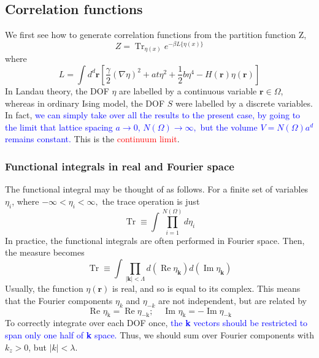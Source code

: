 \documentclass[12pt,titlepage]{article}
\newcommand{\redp}[1]{\textcolor{red}{#1}}
\newcommand{\bluep}[1]{\textcolor{blue}{#1}}
\numberwithin{equation}{section}
\begin{document}
\subsection{Correlation functions}
We first see how to generate correlation functions from the partition function Z,
\begin{equation}
Z=\operatorname{Tr}_{\eta(x)} e^{-\beta L\{\eta(x)\}}
\end{equation}
where
\begin{equation}
L=\int d^{d} \mathbf{r}\left[\frac{\gamma}{2}(\nabla \eta)^{2}+a t \eta^{2}+\frac{1}{2} b \eta^{4}-H(\mathbf{r}) \eta(\mathbf{r})\right]
\end{equation}
In Landau theory, the DOF $\eta$ are labelled by a continuous variable $\mathbf{r} \in \Omega$, whereas in ordinary Ising model, the DOF $S$ were labelled by a discrete variables. In fact, \bluep{we can simply take over all the results to the present case, by going to the limit that lattice spacing $a \rightarrow 0$, $N(\Omega) \rightarrow \infty,$ but the volume $V=N(\Omega) a^{d}$ remains constant.} This is the \redp{continuum limit}.

\subsubsection{Functional integrals in real and Fourier space}
The functional integral may be thought of as follows. For a finite set of variables $\eta_i$, where $-\infty<\eta_{i}<\infty,$ the trace operation is just
\begin{equation}
\operatorname{Tr} \equiv \int \prod_{i=1}^{N(\Omega)} d \eta_{i}
\end{equation}
In practice, the functional integrals are often performed in Fourier space. Then, the measure becomes
\begin{equation}
\operatorname{Tr} \equiv \int \prod_{|\mathbf{k}|<\Lambda} d\left(\operatorname{Re} \eta_{\mathbf{k}}\right) d\left(\operatorname{Im} \eta_{\mathbf{k}}\right)
\end{equation}
Usually, the function $\eta(\mathbf{r})$ is real, and so is equal to its complex. This means that the Fourier components $\eta_{k}$ and $\eta_{-k}$ are not independent, but are related by
\begin{equation}
\text { Re } \eta_{\mathrm{k}}=\operatorname{Re} \eta_{-\mathrm{k}} ; \quad \text { Im } \eta_{\mathrm{k}}=-\operatorname{Im} \eta_{-\mathrm{k}}
\end{equation}
To correctly integrate over each DOF once, \bluep{the \textbf{k} vectors should be restricted to span only one half of \textbf{k} space.} Thus, we should sum over Fourier components with $k_z>0$, but $|k|<\lambda$.
\end{document}
